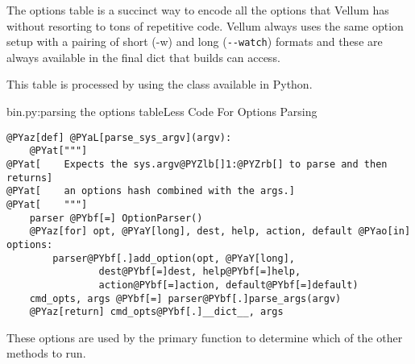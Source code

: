 The options table is a succinct way to encode all the options that Vellum has
without resorting to tons of repetitive code.  Vellum always uses the same
option setup with a pairing of short (-w) and long (\verb|--watch|) formats and these
are always available in the final  dict that builds can access.

This table is processed by  using the
 class available in Python.

\begin{code}{bin.py:parsing the options table}{Less Code For Options Parsing}
\begin{Verbatim}[commandchars=@\[\]]
@PYaz[def] @PYaL[parse_sys_argv](argv):
    @PYat["""]
@PYat[    Expects the sys.argv@PYZlb[]1:@PYZrb[] to parse and then returns]
@PYat[    an options hash combined with the args.]
@PYat[    """]
    parser @PYbf[=] OptionParser()
    @PYaz[for] opt, @PYaY[long], dest, help, action, default @PYao[in] options:
        parser@PYbf[.]add_option(opt, @PYaY[long], 
                dest@PYbf[=]dest, help@PYbf[=]help, 
                action@PYbf[=]action, default@PYbf[=]default)
    cmd_opts, args @PYbf[=] parser@PYbf[.]parse_args(argv)
    @PYaz[return] cmd_opts@PYbf[.]__dict__, args
\end{Verbatim}

\end{code}

These options are used by the primary  function to determine
which of the other methods to run.

